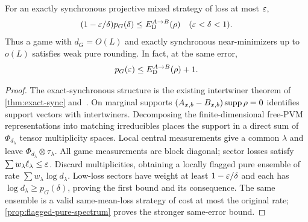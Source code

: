 \begin{proposition}\label{prop:synchronous-pure-rounding}
For an exactly synchronous projective mixed strategy of loss at most $\varepsilon$,
\[
 (1-\varepsilon/\delta)p_G(\delta)\le E_{\mathrm D}^{A\to B}(\rho)\quad(\varepsilon<\delta<1).
\]
Thus a game with $d_G=O(L)$ and exactly synchronous near-minimizers up to $o(L)$ satisfies weak pure rounding. In fact, at the same error,
\[
 p_G(\varepsilon)\le E_{\mathrm D}^{A\to B}(\rho)+1.
\]
\end{proposition}
\begin{proof}
The exact-synchronous structure is the existing intertwiner theorem of \cref{thm:exact-sync} and~\cite{PSSTW16}. On marginal supports $(A_{x,b}-B_{x,b})\operatorname{supp}\rho=0$ identifies support vectors with intertwiners. Decomposing the finite-dimensional free-PVM representations into matching irreducibles places the support in a direct sum of $\Phi_{d_\lambda}$ tensor multiplicity spaces. Local central measurements give a common $\lambda$ and leave $\Phi_{d_\lambda}\otimes\tau_\lambda$. All game measurements are block diagonal; sector losses satisfy $\sum w_\lambda\ell_\lambda\le\varepsilon$. Discard multiplicities, obtaining a locally flagged pure ensemble of rate $\sum w_\lambda\log d_\lambda$. Low-loss sectors have weight at least $1-\varepsilon/\delta$ and each has $\log d_\lambda\ge p_G(\delta)$, proving the first bound and its consequence. The same ensemble is a valid same-mean-loss strategy of cost at most the original rate; \cref{prop:flagged-pure-spectrum} proves the stronger same-error bound.
\end{proof}

